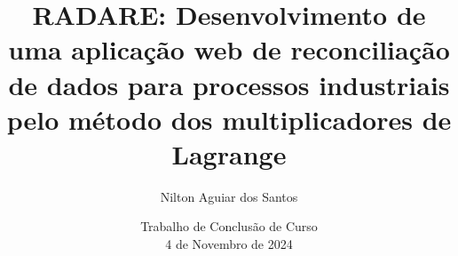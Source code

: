 \author[Nilton Aguiar dos Santos]{Nilton Aguiar dos Santos}
\title[RADARE]{RADARE: Desenvolvimento de uma aplicação web de reconciliação de dados para processos industriais pelo método dos multiplicadores de Lagrange}
\date[\today]{\small{Trabalho de Conclusão de Curso} \\ \small{4 de Novembro de 2024}}
